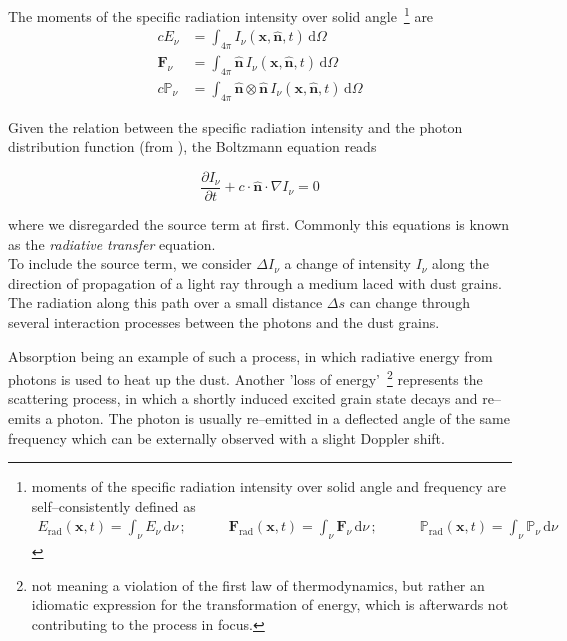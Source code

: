The moments of the specific radiation intensity over solid angle~\footnote{moments of the specific radiation intensity over solid angle and frequency are self--consistently defined as \begin{align*}
															E_{\text{rad}}(\textbf{x}, t) = \int_{\nu} E_{\nu}\,\mathrm{d}\nu \,; \quad\qquad
															\textbf{F}_{\text{rad}}(\textbf{x}, t) = \int_{\nu} \textbf{F}_{\nu}\,\mathrm{d}\nu \,; \quad\qquad
															\mathbb{P}_{\text{rad}}(\textbf{x}, t) = \int_{\nu} \mathbb{P}_{\nu}\,\mathrm{d}\nu
														       \end{align*}
} are
\begin{align}
  cE_{\nu} &= \int_{4\pi} I_{\nu}(\textbf{x}, \hat{\textbf{n}}, t)\,\mathrm{d}\Omega \label{eq:spec_energy} \\
  \textbf{F}_{\nu} &= \int_{4\pi} \hat{\textbf{n}}\,I_{\nu}(\textbf{x}, \hat{\textbf{n}}, t)\,\mathrm{d}\Omega \label{eq:spec_flux} \\
  c\mathbb{P}_{\nu} &= \int_{4\pi} \hat{\textbf{n}}\otimes\hat{\textbf{n}}\,I_{\nu}(\textbf{x}, \hat{\textbf{n}}, t)\,\mathrm{d}\Omega \label{eq:spec_press}
\end{align}

Given the relation between the specific radiation intensity and the photon distribution function (from ), the Boltzmann equation reads

\begin{equation}
  \frac{\partial I_{\nu}}{\partial t} + c\cdot\hat{\textbf{n}}\cdot\nabla I_{\nu} = 0
\end{equation}

where we disregarded the source term at first.
Commonly this equations is known as the \textit{radiative transfer} equation.
\\[6pt]
%
To include the source term, we consider $\Delta I_{\nu}$ a change of intensity $I_{\nu}$ along the direction of propagation of a light ray through a medium laced with dust grains.
The radiation along this path over a small distance $\Delta s$ can change through several interaction processes between the photons and the dust grains.

Absorption being an example of such a process, in which radiative energy from photons is used to heat up the dust.
Another 'loss of energy'~\footnote{not meaning a violation of the first law of thermodynamics, but rather an idiomatic expression for the transformation of energy, which is afterwards not contributing to the process in focus.} represents the scattering process, in which a shortly induced excited grain state decays and re--emits a photon.
The photon is usually re--emitted in a deflected angle of the same frequency which can be externally observed with a slight Doppler shift.

